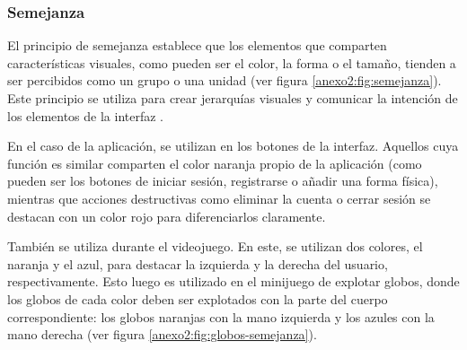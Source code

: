 

\subsubsection{Semejanza}
El principio de semejanza establece que los elementos que comparten
características visuales, como pueden ser el color, la forma o el tamaño,
tienden a ser percibidos como un grupo o una unidad (ver figura
\ref{anexo2:fig:semejanza}). Este principio se utiliza para crear jerarquías
visuales y comunicar la intención de los elementos de la interfaz
\parencite{Soegaard2015Gestalt}.


En el caso de la aplicación, se utilizan en los botones de la interfaz. Aquellos
cuya función es similar comparten el color naranja propio de la aplicación (como
pueden ser los botones de iniciar sesión, registrarse o añadir una forma
física), mientras que acciones destructivas como eliminar la cuenta o cerrar
sesión se destacan con un color rojo para diferenciarlos claramente.

También se utiliza durante el videojuego. En este, se utilizan dos colores, el
naranja y el azul, para destacar la izquierda y la derecha del usuario,
respectivamente. Esto luego es utilizado en el minijuego de explotar globos,
donde los globos de cada color deben ser explotados con la parte del cuerpo
correspondiente: los globos naranjas con la mano izquierda y los azules con la
mano derecha (ver figura \ref{anexo2:fig:globos-semejanza}).



